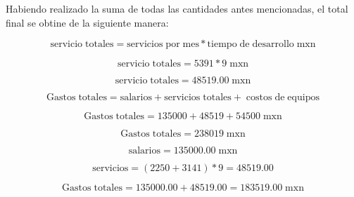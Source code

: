 Habiendo realizado la suma de todas las cantidades antes mencionadas, el total final se obtine de la siguiente manera:

\begin{equation} \label{eq:cap4-09.00}
    \mathrm{servicio\; totales} = \mathrm{servicios\; por\; mes} * \mathrm{tiempo\; de\; desarrollo} \mathrm{\;mxn}
\end{equation}

\begin{equation} \label{eq:cap4-09.01}
    \mathrm{servicio\; totales} = 5391 * 9 \mathrm{\;mxn}
\end{equation}

\begin{equation} \label{eq:cap4-09.02}
    \mathrm{servicio\; totales} = 48 519.00 \mathrm{\;mxn}
\end{equation}

\begin{equation} \label{eq:cap4-10.00}
    \mathrm{Gastos\; totales} = \mathrm{salarios} + \mathrm{servicios\; totales} + \mathrm{\;costos\;de\;equipos}
\end{equation}

\begin{equation} \label{eq:cap4-10.01}
    \mathrm{Gastos\; totales} = 135 000 + 48 519 + 54 500 \mathrm{\;mxn}
\end{equation}

\begin{equation} \label{eq:cap4-10.02}
    \mathrm{Gastos\; totales} = 238 019 \mathrm{\;mxn}
\end{equation}

\begin{equation} \label{eq:cap4-11.00}
    \mathrm{salarios} = 135 000.00 \mathrm{\;mxn}
\end{equation}

\begin{equation} \label{eq:cap4-11.01}
    \mathrm{servicios} = (2250 + 3141) * 9 = 48 519.00
\end{equation}

\begin{equation} \label{eq:cap4-11.02}
    \mathrm{Gastos\; totales} = 135 000.00 + 48 519.00 = 183 519.00 \mathrm{\;mxn}
\end{equation}
